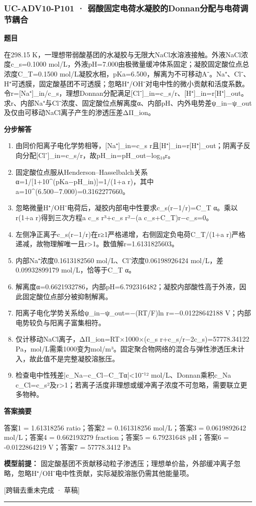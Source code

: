 \documentclass[UTF8,11pt,a4paper]{ctexart}
\begin{document}
\subsubsection*{UC-ADV10-P101 · 弱酸固定电荷水凝胶的Donnan分配与电荷调节耦合}
\noindent\textbf{题目}\par
在298.15 K，一理想带弱酸基团的水凝胶与无限大NaCl水溶液接触。外液NaCl浓度c\_s=0.1000 mol/L，外液pH=7.000由极微量缓冲体系固定；凝胶固定酸位点总浓度C\_T=0.1500 mol/L凝胶水相，pKa=6.500，解离为不可移动A⁻。Na⁺、Cl⁻、H⁺可透膜，固定酸基团不可透膜；忽略H⁺/OH⁻对电中性的微小贡献和活度系数。令r=[Na⁺]\_in/c\_s，理想Donnan分配满足[Cl⁻]\_in=c\_s/r、[H⁺]\_in=r[H⁺]\_out。求r、内部Na⁺与Cl⁻浓度、固定酸位点解离度α、内部pH、内外电势差ψ\_in−ψ\_out及仅由可移动NaCl离子产生的渗透压差ΔΠ\_ion。\par
\medskip\noindent\textbf{分步解答}
\begin{enumerate}
\item 由同价阳离子电化学势相等，[Na⁺]\_in=c\_s r且[H⁺]\_in=r[H⁺]\_out；阴离子反向分配[Cl⁻]\_in=c\_s/r，故pH\_in=pH\_out−log₁₀r。
\item 固定酸位点服从Henderson–Hasselbalch关系α=1/[1+10\textasciicircum{}(pKa−pH\_in)]=1/(1+a r)，其中a=10\textasciicircum{}(6.500−7.000)=0.3162277660。
\item 忽略微量H⁺/OH⁻电荷后，凝胶内部电中性要求c\_s(r−1/r)=C\_T α。乘以r(1+a r)得到三次方程a c\_s r³+c\_s r²−(a c\_s+C\_T)r−c\_s=0。
\item 左侧净正离子c\_s(r−1/r)在r≥1严格递增，右侧固定负电荷C\_T/(1+a r)严格递减，故物理解唯一且r>1。数值解r=1.6131825603。
\item 内部Na⁺浓度0.1613182560 mol/L、Cl⁻浓度0.06198926424 mol/L，差0.09932899179 mol/L，恰等于C\_T α。
\item 解离度α=0.6621932786，内部pH=6.792316482；凝胶内部酸性高于外液，因此固定酸位点部分被抑制解离。
\item 阳离子电化学势关系给ψ\_in−ψ\_out=−(RT/F)ln r=−0.01228642188 V；内部电势较负与阳离子富集相符。
\item 仅计移动NaCl离子，ΔΠ\_ion=RT×1000×(c\_s r+c\_s/r−2c\_s)=57778.34122 Pa，mol/L需乘1000变为mol/m³。固定聚合物网络的混合与弹性渗透压未计入，故此值不是完整凝胶溶胀压。
\item 检查电中性残差|c\_Na−c\_Cl−C\_Tα|<10⁻¹² mol/L、Donnan乘积c\_Na c\_Cl=c\_s²及r>1；若离子活度非理想或缓冲离子浓度不可忽略，需要联立更多物种。
\end{enumerate}
\noindent\textbf{答案摘要}\par
答案1 = 1.61318256 ratio；答案2 = 0.161318256 mol/L；答案3 = 0.0619892642 mol/L；答案4 = 0.662193279 fraction；答案5 = 6.79231648 pH；答案6 = -0.0122864219 V；答案7 = 57778.3412 Pa\par
\noindent\textbf{模型前提：}
固定酸基团不贡献移动粒子渗透压；理想单价盐，外部缓冲离子忽略，忽略H⁺/OH⁻电中性贡献，实际凝胶溶胀仍需其他能量项。\par
\noindent\textcolor{red!65!black}{[跨辑去重未完成 · 草稿]} \par
\medskip\hrule\medskip
{}
\end{document}

